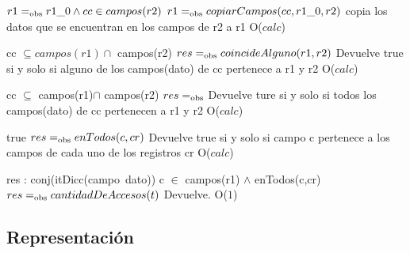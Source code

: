 {$r1 =_{\mathrm{obs}} r1\_0 \land  cc \in  campos(r2) $}
{$r1 =_{\mathrm{obs}} copiarCampos(cc, r1\_0, r2)$}
 {copia los datos que se encuentran en los campos de r2 a r1}
{O($calc$)}
 {}%

 {cc $\subseteq campos(r1)\cap$ campos(r2)}
 {$res =_{\mathrm{obs}} coincideAlguno(r1, r2)$}
 {Devuelve true si y solo si alguno de los campos(dato) de cc pertenece a r1 y r2}
 {O($calc$)}
 {}
 
 {cc $\subseteq$ campos(r1)$\cap$ campos(r2)}
 {$res =_{\mathrm{obs}} $}
 {Devuelve ture si y solo si todos los campos(dato) de cc pertenecen a r1 y r2}
 {O($calc$) } 
 {}
 
 {true}
 {$res =_{\mathrm{obs}} enTodos(c,cr)$}
 {Devuelve true si y solo si campo c pertenece a los campos de cada uno de los registros cr}
 {O($calc$)}
 {}

{res : conj(itDicc(campo\, dato))}
 {c $\in $ campos(r1) $\land$ enTodos(c,cr)}
{$res =_{\mathrm{obs}} cantidadDeAccesos(t)$}
{Devuelve. }
{O($1$)}
 {}

\subsection{Representación}


